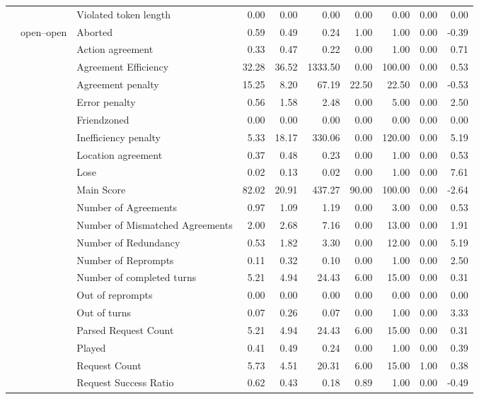 \begin{tabular}{lllrrrrrrr}
 &  & Violated token length & 0.00 & 0.00 & 0.00 & 0.00 & 0.00 & 0.00 & 0.00 \\
\cline{2-10}
 & \multirow[t]{27}{*}{open--open} & Aborted & 0.59 & 0.49 & 0.24 & 1.00 & 1.00 & 0.00 & -0.39 \\
 &  & Action agreement & 0.33 & 0.47 & 0.22 & 0.00 & 1.00 & 0.00 & 0.71 \\
 &  & Agreement Efficiency & 32.28 & 36.52 & 1333.50 & 0.00 & 100.00 & 0.00 & 0.53 \\
 &  & Agreement penalty & 15.25 & 8.20 & 67.19 & 22.50 & 22.50 & 0.00 & -0.53 \\
 &  & Error penalty & 0.56 & 1.58 & 2.48 & 0.00 & 5.00 & 0.00 & 2.50 \\
 &  & Friendzoned & 0.00 & 0.00 & 0.00 & 0.00 & 0.00 & 0.00 & 0.00 \\
 &  & Inefficiency penalty & 5.33 & 18.17 & 330.06 & 0.00 & 120.00 & 0.00 & 5.19 \\
 &  & Location agreement & 0.37 & 0.48 & 0.23 & 0.00 & 1.00 & 0.00 & 0.53 \\
 &  & Lose & 0.02 & 0.13 & 0.02 & 0.00 & 1.00 & 0.00 & 7.61 \\
 &  & Main Score & 82.02 & 20.91 & 437.27 & 90.00 & 100.00 & 0.00 & -2.64 \\
 &  & Number of Agreements & 0.97 & 1.09 & 1.19 & 0.00 & 3.00 & 0.00 & 0.53 \\
 &  & Number of Mismatched Agreements & 2.00 & 2.68 & 7.16 & 0.00 & 13.00 & 0.00 & 1.91 \\
 &  & Number of Redundancy & 0.53 & 1.82 & 3.30 & 0.00 & 12.00 & 0.00 & 5.19 \\
 &  & Number of Reprompts & 0.11 & 0.32 & 0.10 & 0.00 & 1.00 & 0.00 & 2.50 \\
 &  & Number of completed turns & 5.21 & 4.94 & 24.43 & 6.00 & 15.00 & 0.00 & 0.31 \\
 &  & Out of reprompts & 0.00 & 0.00 & 0.00 & 0.00 & 0.00 & 0.00 & 0.00 \\
 &  & Out of turns & 0.07 & 0.26 & 0.07 & 0.00 & 1.00 & 0.00 & 3.33 \\
 &  & Parsed Request Count & 5.21 & 4.94 & 24.43 & 6.00 & 15.00 & 0.00 & 0.31 \\
 &  & Played & 0.41 & 0.49 & 0.24 & 0.00 & 1.00 & 0.00 & 0.39 \\
 &  & Request Count & 5.73 & 4.51 & 20.31 & 6.00 & 15.00 & 1.00 & 0.38 \\
 &  & Request Success Ratio & 0.62 & 0.43 & 0.18 & 0.89 & 1.00 & 0.00 & -0.49 \\

\end{tabular}
